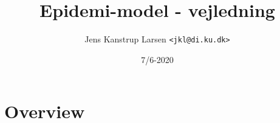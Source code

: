 \documentclass{article}
\title{Epidemi-model - vejledning}
\author{Jens Kanstrup Larsen \texttt{<jkl@di.ku.dk>}}
\date{7/6-2020}
\begin{document}
\maketitle

\section{Overview}
\end{document}
